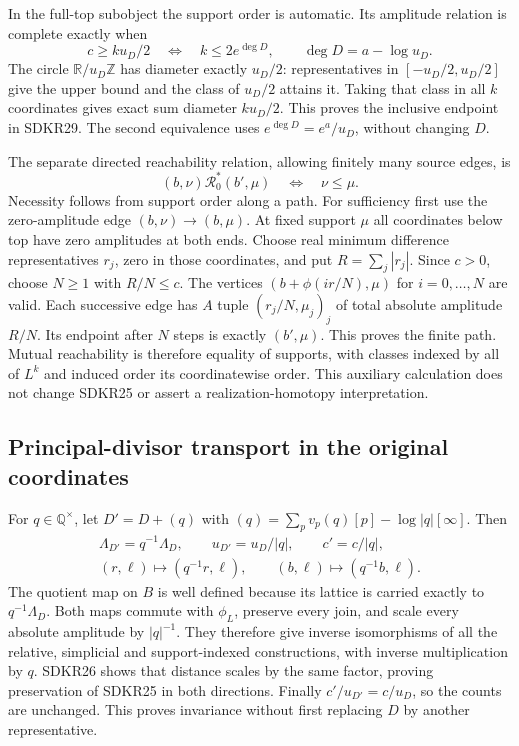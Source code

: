 In the full-top subobject the support order is automatic.
Its amplitude relation is complete exactly when
\begin{equation}\tag{SDKR29}
c\ge ku_D/2
\quad\Longleftrightarrow\quad k\le2e^{\deg D},
\qquad \deg D=a-\log u_D .
\end{equation}
The circle $\mathbb R/u_D\mathbb Z$ has diameter exactly
$u_D/2$: representatives in $[-u_D/2,u_D/2]$ give the
upper bound and the class of $u_D/2$ attains it.
Taking that class in all $k$ coordinates gives exact
sum diameter $ku_D/2$. This proves the inclusive
endpoint in SDKR29. The second equivalence uses
$e^{\deg D}=e^a/u_D$, without changing $D$.

The separate directed reachability relation, allowing
finitely many source edges, is
\begin{equation}\tag{SDKR30}
(b,\nu)\mathcal R_0^*(b',\mu)
          \quad\Longleftrightarrow\quad \nu\le\mu.
\end{equation}
Necessity follows from support order along a path.
For sufficiency first use the zero-amplitude edge
$(b,\nu)\to(b,\mu)$. At fixed support $\mu$ all
coordinates below top have zero amplitudes at both
ends. Choose real minimum difference representatives
$r_j$, zero in those coordinates, and put
$R=\sum_j|r_j|$. Since $c>0$, choose $N\ge1$ with
$R/N\le c$. The vertices
$(b+\phi(i r/N),\mu)$ for $i=0,\ldots,N$ are valid.
Each successive edge has $A$ tuple $(r_j/N,\mu_j)_j$
of total absolute amplitude $R/N$. Its endpoint
after $N$ steps is exactly $(b',\mu)$.
This proves the finite path. Mutual reachability
is therefore equality of supports, with classes
indexed by all of $L^k$ and induced order its
coordinatewise order. This auxiliary calculation
does not change SDKR25 or assert a realization-homotopy
interpretation.

\subsection{Principal-divisor transport in the original coordinates}

For $q\in\mathbb Q^\times$, let $D'=D+(q)$ with
$(q)=\sum_pv_p(q)[p]-\log|q|[\infty]$. Then
\begin{equation}\tag{SDKR31}
\begin{gathered}
\Lambda_{D'}=q^{-1}\Lambda_D,\qquad
u_{D'}=u_D/|q|,\qquad c'=c/|q|,\\
(r,\ell)\mapsto(q^{-1}r,\ell),\qquad
(b,\ell)\mapsto(q^{-1}b,\ell).
\end{gathered}
\end{equation}
The quotient map on $B$ is well defined because its
lattice is carried exactly to $q^{-1}\Lambda_D$.
Both maps commute with $\phi_L$, preserve every join,
and scale every absolute amplitude by $|q|^{-1}$.
They therefore give inverse isomorphisms of all the
relative, simplicial and support-indexed constructions,
with inverse multiplication by $q$. SDKR26 shows that
distance scales by the same factor, proving preservation
of SDKR25 in both directions. Finally
$c'/u_{D'}=c/u_D$, so the counts are unchanged.
This proves invariance without first replacing $D$
by another representative.

